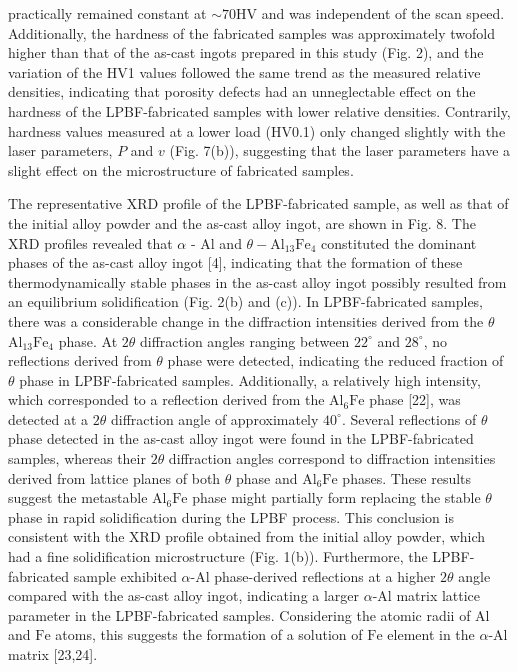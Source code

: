 \documentclass[10pt]{article}
\begin{document}
practically remained constant at $\sim 70 \mathrm{HV}$ and was independent of the scan speed. Additionally, the hardness of the fabricated samples was approximately twofold higher than that of the as-cast ingots prepared in this study (Fig. 2), and the variation of the HV1 values followed the same trend as the measured relative densities, indicating that porosity defects had an unneglectable effect on the hardness of the LPBF-fabricated samples with lower relative densities. Contrarily, hardness values measured at a lower load (HV0.1) only changed slightly with the laser parameters, $P$ and $v$ (Fig. 7(b)), suggesting that the laser parameters have a slight effect on the microstructure of fabricated samples.

The representative XRD profile of the LPBF-fabricated sample, as well as that of the initial alloy powder and the as-cast alloy ingot, are shown in Fig. 8. The XRD profiles revealed that $\alpha$ - $\mathrm{Al}$ and $\theta-\mathrm{Al}_{13} \mathrm{Fe}_{4}$ constituted the dominant phases of the as-cast alloy ingot [4], indicating that the formation of these thermodynamically stable phases in the as-cast alloy ingot possibly resulted from an equilibrium solidification (Fig. 2(b) and (c)). In LPBF-fabricated samples, there was a considerable change in the diffraction intensities derived from the $\theta$ $\mathrm{Al}_{13} \mathrm{Fe}_{4}$ phase. At $2 \theta$ diffraction angles ranging between $22^{\circ}$ and $28^{\circ}$, no reflections derived from $\theta$ phase were detected, indicating the reduced fraction of $\theta$ phase in LPBF-fabricated samples. Additionally, a relatively high intensity, which corresponded to a reflection derived from the $\mathrm{Al}_{6} \mathrm{Fe}$ phase [22], was detected at a $2 \theta$ diffraction angle of approximately $40^{\circ}$. Several reflections of $\theta$ phase detected in the as-cast alloy ingot were found in the LPBF-fabricated samples, whereas their $2 \theta$ diffraction angles correspond to diffraction intensities derived from lattice planes of both $\theta$ phase and $\mathrm{Al}_{6} \mathrm{Fe}$ phases. These results suggest the metastable $\mathrm{Al}_{6} \mathrm{Fe}$ phase might partially form replacing the stable $\theta$ phase in rapid solidification during the LPBF process. This conclusion is consistent with the XRD profile obtained from the initial alloy powder, which had a fine solidification microstructure (Fig. 1(b)). Furthermore, the LPBF-fabricated sample exhibited $\alpha$-Al phase-derived reflections at a higher $2 \theta$ angle compared with the as-cast alloy ingot, indicating a larger $\alpha$-Al matrix lattice parameter in the LPBF-fabricated samples. Considering the atomic radii of $\mathrm{Al}$ and $\mathrm{Fe}$ atoms, this suggests the formation of a solution of $\mathrm{Fe}$ element in the $\alpha$-Al matrix [23,24].
\end{document}
